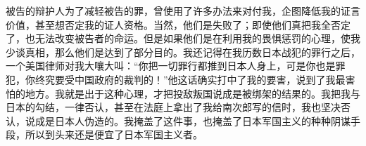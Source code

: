 被告的辩护人为了减轻被告的罪，曾使用了许多办法来对付我，企图降低我的证言价值，甚至想否定我的证人资格。当然，他们是失败了；即使他们真把我全否定了，也无法改变被告者的命运。但是如果他们是在利用我的畏惧惩罚的心理，使我少谈真相，那么他们是达到了部分目的。我还记得在我历数日本战犯的罪行之后，一个美国律师对我大嚷大叫：“你把一切罪行都推到日本人身上，可是你也是罪犯，你终究要受中国政府的裁判的！”他这话确实打中了我的要害，说到了我最害怕的地方。我就是出于这种心理，才把投敌叛国说成是被绑架的结果的。我把我与日本的勾结，一律否认，甚至在法庭上拿出了我给南次郎写的信时，我也坚决否认，说成是日本人伪造的。我掩盖了这件事，也掩盖了日本军国主义的种种阴谋手段，所以到头来还是便宜了日本军国主义者。\\